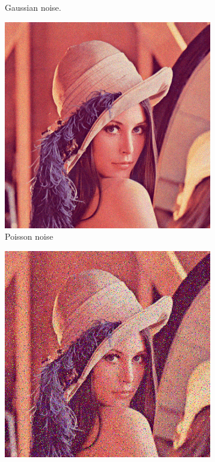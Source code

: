 \begin{figure}[h]
\begin{subfigure}{0.3\textwidth}
		\caption{Gaussian noise.}
	\end{subfigure}
	\begin{subfigure}{0.3\textwidth}
		\includegraphics[width=\textwidth]{images/noises/poisson.png}
		\caption{Poisson noise}
	\end{subfigure}
	\begin{subfigure}{0.3\textwidth}
		\includegraphics[width=\textwidth]{images/noises/sp.png}

\end{subfigure}
\end{figure}

